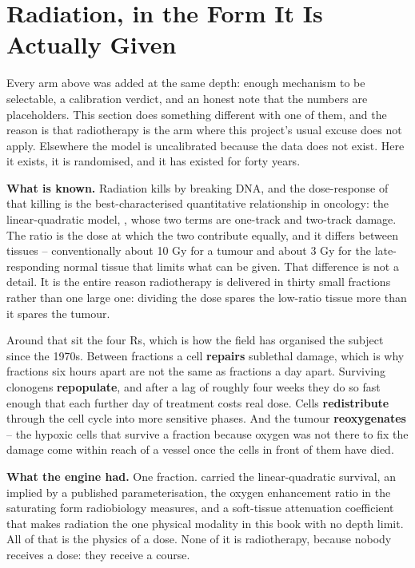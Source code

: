 \documentclass[11pt,twoside,openright]{report}
\begin{document}
\section{Radiation, in the Form It Is Actually Given}

Every arm above was added at the same depth: enough mechanism to be selectable, a calibration verdict, and an honest note that the numbers are placeholders. This section does something different with one of them, and the reason is that radiotherapy is the arm where this project's usual excuse does not apply. Elsewhere the model is uncalibrated because the data does not exist. Here it exists, it is randomised, and it has existed for forty years.

\textbf{What is known.} Radiation kills by breaking DNA, and the dose-response of that killing is the best-characterised quantitative relationship in oncology: the linear-quadratic model, , whose two terms are one-track and two-track damage. The ratio  is the dose at which the two contribute equally, and it differs between tissues -- conventionally about 10 Gy for a tumour and about 3 Gy for the late-responding normal tissue that limits what can be given. That difference is not a detail. It is the entire reason radiotherapy is delivered in thirty small fractions rather than one large one: dividing the dose spares the low-ratio tissue more than it spares the tumour.

Around that sit the four Rs, which is how the field has organised the subject since the 1970s. Between fractions a cell \textbf{repairs} sublethal damage, which is why fractions six hours apart are not the same as fractions a day apart. Surviving clonogens \textbf{repopulate}, and after a lag of roughly four weeks they do so fast enough that each further day of treatment costs real dose. Cells \textbf{redistribute} through the cell cycle into more sensitive phases. And the tumour \textbf{reoxygenates} -- the hypoxic cells that survive a fraction because oxygen was not there to fix the damage come within reach of a vessel once the cells in front of them have died.

\textbf{What the engine had.} One fraction.  carried the linear-quadratic survival, an  implied by a published parameterisation, the oxygen enhancement ratio in the saturating form radiobiology measures, and a soft-tissue attenuation coefficient that makes radiation the one physical modality in this book with no depth limit. All of that is the physics of a dose. None of it is radiotherapy, because nobody receives a dose: they receive a course.
\end{document}

